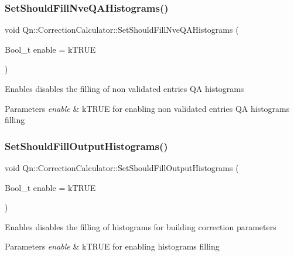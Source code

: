 \subsubsection{\texorpdfstring{Set\+Should\+Fill\+Nve\+Q\+A\+Histograms()}{SetShouldFillNveQAHistograms()}}
{\footnotesize\ttfamily void Qn\+::\+Correction\+Calculator\+::\+Set\+Should\+Fill\+Nve\+Q\+A\+Histograms (\begin{DoxyParamCaption}\item[{Bool\+\_\+t}]{enable = {\ttfamily kTRUE} }\end{DoxyParamCaption})\hspace{0.3cm}{\ttfamily [inline]}}

Enables disables the filling of non validated entries QA histograms 
\begin{DoxyParams}{Parameters}
{\em enable} & k\+T\+R\+UE for enabling non validated entries QA histograms filling \\
\hline
\end{DoxyParams}
\mbox{\label{classQn_1_1CorrectionCalculator_a00dfda0d66bfdeeec6497580e491774a}} 
\subsubsection{\texorpdfstring{Set\+Should\+Fill\+Output\+Histograms()}{SetShouldFillOutputHistograms()}}
{\footnotesize\ttfamily void Qn\+::\+Correction\+Calculator\+::\+Set\+Should\+Fill\+Output\+Histograms (\begin{DoxyParamCaption}\item[{Bool\+\_\+t}]{enable = {\ttfamily kTRUE} }\end{DoxyParamCaption})\hspace{0.3cm}{\ttfamily [inline]}}

Enables disables the filling of histograms for building correction parameters 
\begin{DoxyParams}{Parameters}
{\em enable} & k\+T\+R\+UE for enabling histograms filling \\
\hline
\end{DoxyParams}
\mbox{\label{classQn_1_1CorrectionCalculator_a598ddf62e8f05b71bf3e5c573a4af6c2}} 

